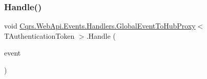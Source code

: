 \subsubsection{\texorpdfstring{Handle()}{Handle()}}
{\footnotesize\ttfamily void \hyperlink{classCqrs_1_1WebApi_1_1Events_1_1Handlers_1_1GlobalEventToHubProxy}{Cqrs.\+Web\+Api.\+Events.\+Handlers.\+Global\+Event\+To\+Hub\+Proxy}$<$ T\+Authentication\+Token $>$.Handle (\begin{DoxyParamCaption}\item[{\hyperlink{interfaceCqrs_1_1Events_1_1IEvent}{I\+Event}$<$ T\+Authentication\+Token $>$ @}]{event }\end{DoxyParamCaption})}

